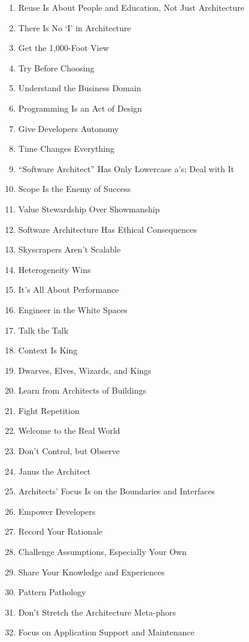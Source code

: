 \documentclass[10pt]{article}
\begin{document}
\begin{multicols}{4}
\begin{enumerate}
      \item Reuse Is About People and Education, Not Just Architecture 
      \item There Is No `I' in Architecture 
      \item Get the 1,000-Foot View 
      \item Try Before Choosing 
      \item Understand the Business Domain 
      \item Programming Is an Act of Design 
      \item Give Developers Autonomy 
      \item Time Changes Everything 
      \item ``Software Architect'' Has Only Lowercase a's; Deal with It 
      \item Scope Is the Enemy of Success 
      \item Value Stewardship Over Showmanship 
      \item Software Architecture Has Ethical Consequences 
      \item Skyscrapers Aren't Scalable 
      \item Heterogeneity Wins 
      \item It's All About Performance 
      \item Engineer in the White Spaces 
      \item Talk the Talk 
      \item Context Is King 
      \item Dwarves, Elves, Wizards, and Kings 
      \item Learn from Architects of Buildings 
      \item Fight Repetition 
      \item Welcome to the Real World 
      \item Don't Control, but Observe 
      \item Janus the Architect 
      \item Architects' Focus Is on the Boundaries and Interfaces 
      \item Empower Developers 
      \item Record Your Rationale 
      \item Challenge Assumptions, Especially Your Own 
      \item Share Your Knowledge and Experiences 
      \item Pattern Pathology 
      \item Don't Stretch the Architecture Meta-phors 
      \item Focus on Application Support and Maintenance 

\end{enumerate}
\end{multicols}
\end{document}
